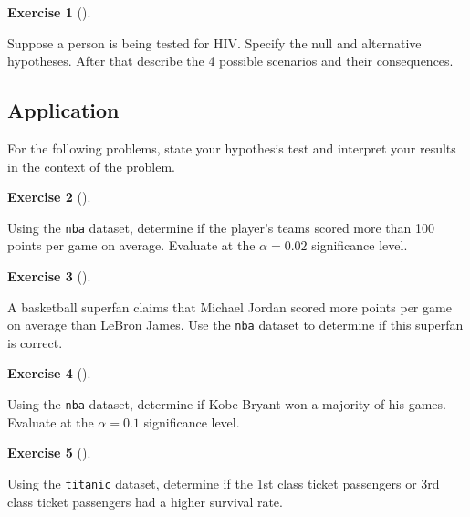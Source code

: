 \documentclass[
  letterpaper,
  DIV=11,
  numbers=noendperiod]{scrreprt}
\theoremstyle{definition}
\newtheorem{exercise}{Exercise}[chapter]
\theoremstyle{remark}
\begin{document}
\begin{exercise}[]\protect\hypertarget{exr-ch12-c10}{}\label{exr-ch12-c10}

Suppose a person is being tested for HIV. Specify the null and
alternative hypotheses. After that describe the 4 possible scenarios and
their consequences.

\end{exercise}

\hypertarget{sec-ex12-application}{%
\subsection{Application}\label{sec-ex12-application}}

For the following problems, state your hypothesis test and interpret
your results in the context of the problem.

\begin{exercise}[]\protect\hypertarget{exr-ch12-app1}{}\label{exr-ch12-app1}

Using the \texttt{nba} dataset, determine if the player's teams scored
more than 100 points per game on average. Evaluate at the
\(\alpha = 0.02\) significance level.

\end{exercise}

\begin{exercise}[]\protect\hypertarget{exr-ch12-app2}{}\label{exr-ch12-app2}

A basketball superfan claims that Michael Jordan scored more points per
game on average than LeBron James. Use the \texttt{nba} dataset to
determine if this superfan is correct.

\end{exercise}

\begin{exercise}[]\protect\hypertarget{exr-ch12-app3}{}\label{exr-ch12-app3}

Using the \texttt{nba} dataset, determine if Kobe Bryant won a majority
of his games. Evaluate at the \(\alpha = 0.1\) significance level.

\end{exercise}

\begin{exercise}[]\protect\hypertarget{exr-ch12-app4}{}\label{exr-ch12-app4}

Using the \texttt{titanic} dataset, determine if the 1st class ticket
passengers or 3rd class ticket passengers had a higher survival rate.

\end{exercise}
\end{document}
